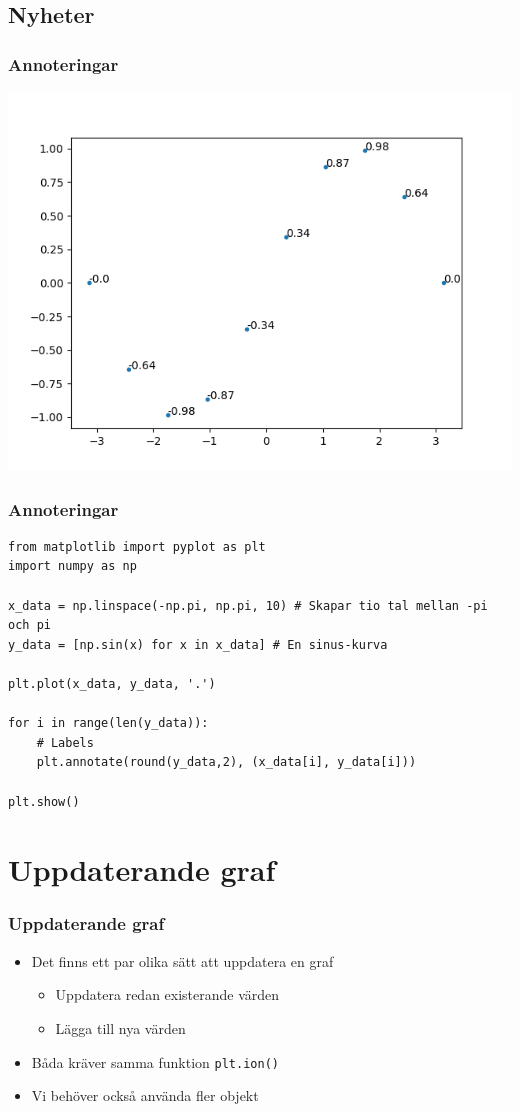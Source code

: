 \documentclass[aspectratio=169]{beamer}
\begin{document}
\subsection{Nyheter}

\begin{frame}
	\frametitle{Annoteringar}
	
	\centering
	\includegraphics[width=.65\linewidth]{Figure-1.png}
	
\end{frame}

\begin{frame}[fragile]
	\frametitle{Annoteringar}

	\begin{lstlisting}
from matplotlib import pyplot as plt
import numpy as np

x_data = np.linspace(-np.pi, np.pi, 10) # Skapar tio tal mellan -pi och pi
y_data = [np.sin(x) for x in x_data] # En sinus-kurva

plt.plot(x_data, y_data, '.')

for i in range(len(y_data)):
    # Labels
    plt.annotate(round(y_data,2), (x_data[i], y_data[i])) 
    
plt.show()
	\end{lstlisting}
	
\end{frame}

\section{Uppdaterande graf}

\begin{frame}[fragile]
	\frametitle{Uppdaterande graf}
	
	\begin{itemize}
		\item Det finns ett par olika sätt att uppdatera en graf
			\begin{itemize}
				\item Uppdatera redan existerande värden
				\item Lägga till nya värden
		\end{itemize}
		\item Båda kräver samma funktion \lstinline{plt.ion()}
		\item Vi behöver också använda fler objekt
	\end{itemize}
	
\end{frame}
\end{document}
